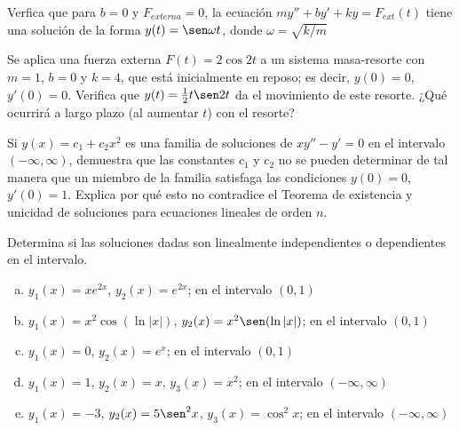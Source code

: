 \documentclass[12pt]{exam}
\begin{document}
    
    \begin{questions}
     \question%
     Verfica que para $b=0$ y $F_{externa}=0$, la ecuación $my''+by'+ky=F_{ext}(t)$ tiene una solución de la forma $y(t)=\sen \omega t$, donde $\omega=\sqrt{k/m}$
     

     \question%
     Se aplica una fuerza externa $F(t)=2\cos2t$ a un sistema masa-resorte con $m=1$, $b=0$ y $k=4$, que está inicialmente en reposo; es decir, $y(0)=0$, $y'(0)=0$. Verifica que $y(t)=\frac{1}{2}t\sen2t$ da el movimiento de este resorte. ¿Qué ocurrirá a largo plazo (al aumentar $t$) con el resorte?

     
     \question%
      Si $y(x)=c_1+c_2x^2$ es una familia de soluciones de $xy''-y'=0$ en el intervalo $(-\infty,\infty)$, demuestra que las constantes $c_1$ y $c_2$ no se pueden determinar de tal manera que un miembro de la familia satisfaga las condiciones $y(0)=0$, $y'(0)=1$. Explica  por qué esto no contradice el Teorema de existencia y unicidad de soluciones para ecuaciones lineales de orden $n$.
     


     \question%
     Determina si las soluciones dadas son linealmente independientes o dependientes en el intervalo.
     \begin{enumerate}[a)]
         \item $y_1(x)=xe^{2x}$, $y_2(x)=e^{2x}$; en el intervalo $(0,1)$
         \item $y_1(x)=x^2\cos(\ln|x|)$, $y_2(x)=x^2\sen(\ln|x|)$; en el intervalo $(0,1)$
         \item $y_1(x)=0$, $y_2(x)=e^x$; en el intervalo $(0,1)$
         \item $y_1(x)=1$, $y_2(x)=x$, $y_3(x)=x^2$; en el intervalo $(-\infty,\infty)$
         \item $y_1(x)=-3$, $y_2(x)=5\sen^2x$, $y_3(x)=\cos^2x$; en el intervalo $(-\infty,\infty)$
     \end{enumerate}






\end{questions}
\end{document}
